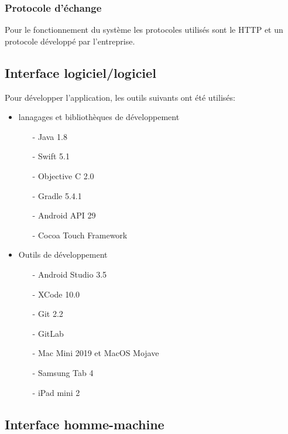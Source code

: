 \subsubsection*{Protocole d'échange}
Pour le fonctionnement du système les protocoles utilisés sont le HTTP et un protocole développé par l'entreprise.

\subsection{Interface logiciel/logiciel}
Pour développer l'application, les outils suivants ont été utilisés:
\begin{itemize}
	\item lanagages et bibliothèques de développement 
	\begin{itemize}
		\item[-] Java 1.8
		\item[-] Swift 5.1
		\item[-] Objective C 2.0
		\item[-] Gradle 5.4.1
		\item[-] Android API 29
		\item[-] Cocoa Touch Framework 
	\end{itemize}
	\item Outils de développement
	\begin{itemize}
		\item[-] Android Studio 3.5
		\item[-] XCode 10.0
		\item[-] Git 2.2
		\item[-] GitLab
		\item[-] Mac Mini 2019 et MacOS Mojave
		\item[-] Samsung Tab 4
		\item[-] iPad mini 2
	\end{itemize}
\end{itemize}

\subsection{Interface homme-machine}
